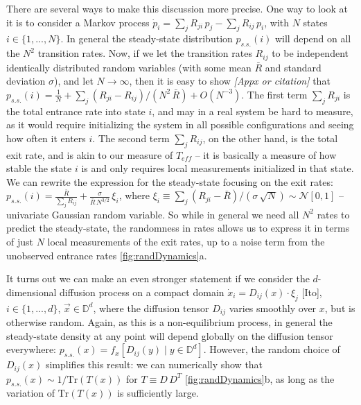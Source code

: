 \documentclass[11pt]{article}
\renewcommand{\v}[1]{\ensuremath{\vec{#1}}} %
\newcommand{\tr}{\mbox{Tr}}
\renewcommand{\=}[1]{\stackrel{#1}{=}} %
\renewcommand{\(}{\left (}
\renewcommand{\)}{\right  )}
\renewcommand{\[}{\left [}
\renewcommand{\]}{\right ]}
\newcommand{\<}{\left <}
\renewcommand{\>}{\right >}
\theoremstyle{definition}
\theoremstyle{remark}
\newcommand{\bigO}[1]{O(#1)}  %
\renewcommand{\todo}[1]{\textit{\color{red}[#1]}}
\begin{document}
There are several ways to make this discussion more precise. One way to look at it is to consider a Markov process $ \dot{p}_i= \sum_j R_{ji}\, p_j - \sum_j R_{ij}\, p_i $, with $ N $ states $ i\in\{1,...,N\} $. In general the steady-state distribution $ p_{s.s.}(i) $ will depend on all the $ N^2 $ transition rates. Now, if we let the transition rates $ R_{ij} $ to be independent identically distributed random variables (with some mean $ \bar{R} $ and standard deviation $ \sigma $), and let $ N \rightarrow \infty$, then it is easy to show \todo{Appx or citation} that $ p_{s.s.}(i)= \frac{1}{N} + \sum_j (R_{ji} - R_{ij})/(N^2\,\bar{R}) + \bigO{N^{-3}}$. The first term $ \sum_j R_{ji} $ is the total entrance rate into state $ i $, and may in a real system be hard to measure, as it would require initializing the system in all possible configurations and seeing how often it enters $ i $. The second term $ \sum_j R_{ij} $, on the other hand, is the total exit rate, and is akin to our measure of $ T_{eff} $ -- it is basically a measure of how stable the state $ i $ is and only requires local measurements initialized in that state. We can rewrite the expression for the steady-state focusing on the exit rates: $ p_{s.s.}(i)= \frac{\bar{R}}{\sum_j R_{ij}} + \frac{\sigma}{\bar{R}\,N^{3/2}}\, \xi_i$, where $ \xi_i \equiv  \sum_j \(R_{ji}-\bar{R}\)/\(\sigma\,\sqrt{N}\)\sim 
\mathcal{N}[0,1]$ -- univariate Gaussian random variable. So while in general we need all $ N^2 $ rates to predict the steady-state, the randomness in rates allows us to express it in terms of just $ N $ local measurements of the exit rates, up to a noise term from  the unobserved entrance rates \ref{fig:randDynamics}a.

It turns out we can make an even stronger statement if we consider the $ d $-dimensional diffusion process on a compact domain $ \dot{x}_i = D_{ij}(x)\cdot\xi_j $ [Ito], $ i\in\{1,...,d\} $, $ \v{x}\in\mathbb{D}^d $, where the diffusion tensor $ D_{ij} $ varies smoothly over $ x $, but is otherwise random. Again, as this is a non-equilibrium process, in general the steady-state density at any point will depend globally on the diffusion tensor everywhere: $ p_{s.s.}(x) = f_x\[D_{ij}(y)\; |\; y\in \mathbb{D}^d \]$. However, the random choice of $ D_{ij}(x) $ simplifies this result: we can numerically show that $ p_{s.s.}(x) \sim 1/\tr\(T(x)\) $ for $ T \equiv D\, D^T$ \ref{fig:randDynamics}b, as long as the variation of $ \tr\(T(x)\) $ is sufficiently large. 
\end{document}
